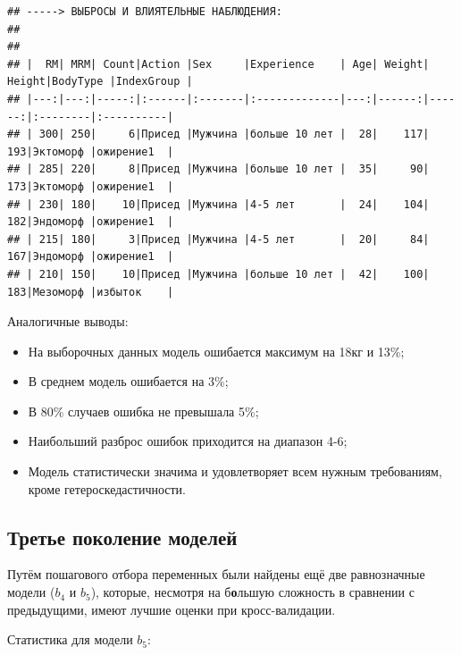 \documentclass[
]{article}
\begin{document}
\begin{verbatim}
## -----> ВЫБРОСЫ И ВЛИЯТЕЛЬНЫЕ НАБЛЮДЕНИЯ:
## 
## 
## |  RM| MRM| Count|Action |Sex     |Experience    | Age| Weight| Height|BodyType |IndexGroup |
## |---:|---:|-----:|:------|:-------|:-------------|---:|------:|------:|:--------|:----------|
## | 300| 250|     6|Присед |Мужчина |больше 10 лет |  28|    117|    193|Эктоморф |ожирение1  |
## | 285| 220|     8|Присед |Мужчина |больше 10 лет |  35|     90|    173|Эктоморф |ожирение1  |
## | 230| 180|    10|Присед |Мужчина |4-5 лет       |  24|    104|    182|Эндоморф |ожирение1  |
## | 215| 180|     3|Присед |Мужчина |4-5 лет       |  20|     84|    167|Эндоморф |ожирение1  |
## | 210| 150|    10|Присед |Мужчина |больше 10 лет |  42|    100|    183|Мезоморф |избыток    |
\end{verbatim}

Аналогичные выводы:

\begin{itemize}
\item
  На выборочных данных модель ошибается максимум на 18кг и 13\%;
\item
  В среднем модель ошибается на 3\%;
\item
  В 80\% случаев ошибка не превышала 5\%;
\item
  Наибольший разброс ошибок приходится на диапазон 4-6;
\item
  Модель статистически значима и удовлетворяет всем нужным требованиям,
  кроме гетероскедастичности.
\end{itemize}

\hypertarget{ux442ux440ux435ux442ux44cux435-ux43fux43eux43aux43eux43bux435ux43dux438ux435-ux43cux43eux434ux435ux43bux435ux439}{%
\subsection{Третье поколение
моделей}\label{ux442ux440ux435ux442ux44cux435-ux43fux43eux43aux43eux43bux435ux43dux438ux435-ux43cux43eux434ux435ux43bux435ux439}}

Путём пошагового отбора переменных были найдены ещё две равнозначные
модели (\(b_4\) и \(b_5\)), которые, несмотря на б\textbf{о}льшую
сложность в сравнении с предыдущими, имеют лучшие оценки при
кросс-валидации.

Статистика для модели \(b_5\):
\end{document}
